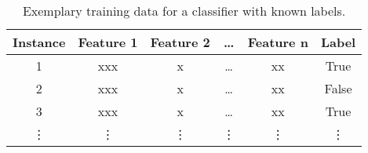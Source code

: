 \begin{table}[ht]
    \small
    \centering
    \begin{tabular}{@{}cccccc@{}}
        \toprule
        \textbf{Instance} & \textbf{Feature 1} & \textbf{Feature 2} & \dots  & \textbf{Feature n} & \textbf{Label} \\
        \midrule
        1                 & xxx                & x                  & \dots  & xx                 & True           \\
        2                 & xxx                & x                  & \dots  & xx                 & False          \\
        3                 & xxx                & x                  & \dots  & xx                 & True           \\
        \vdots            & \vdots             & \vdots             & \vdots & \vdots             & \vdots         \\
        \bottomrule
    \end{tabular}
    \caption[Exemplary training data for a classifier with known labels.]{Exemplary training data for a classifier with known labels. \footnotemark}
    \label{tab:classifier_label_data}
\end{table}

